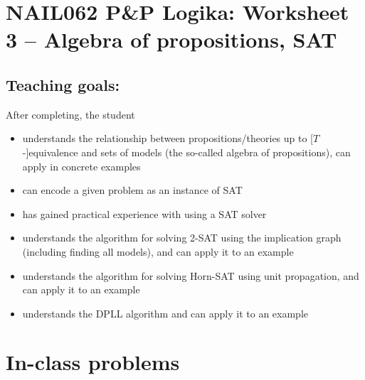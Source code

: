 \section*{NAIL062 P\&P Logika: Worksheet 3 -- Algebra of propositions, SAT}

\subsection*{Teaching goals:} After completing, the student

\begin{itemize}\setlength{\itemsep}{0pt}
    \item understands the relationship between propositions/theories up to [$T$-]equivalence and sets of models (the so-called algebra of propositions), can apply in concrete examples
    \item can encode a given problem as an instance of SAT
    \item has gained practical experience with using a SAT solver
    \item understands the algorithm for solving 2-SAT using the implication graph (including finding all models), and can apply it to an example
    \item understands the algorithm for solving Horn-SAT using unit propagation, and can apply it to an example
    \item understands the DPLL algorithm and can apply it to an example
\end{itemize}


\section*{In-class problems}


